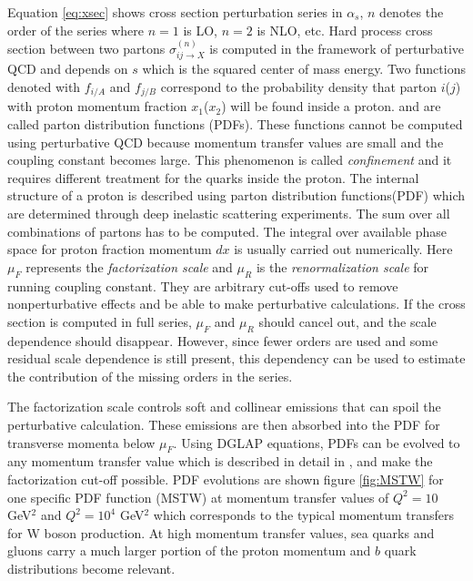 \par Equation \ref{eq:xsec} shows cross section perturbation series in $\alpha_s$, $n$ denotes the order of the series where $n=1$ is LO, $n=2$ is NLO, etc. 
Hard process cross section between two partons $\sigma_{ij \rightarrow X}^{(n)}$ is computed in the framework of perturbative QCD and depends on $s$ which is the squared center of mass energy. 
Two functions denoted with $f_{i/A}$ and $f_{j/B}$ correspond to the probability density that parton $i$($j$) with proton momentum fraction $x_1$($x_2$) will be found inside a proton. and are called parton distribution functions (PDFs). These functions cannot be computed using perturbative QCD because momentum transfer values are small and the coupling constant becomes large. This phenomenon is called \textit{confinement} and it requires different treatment for the quarks inside the proton. The internal structure of a proton is described using parton distribution functions(PDF) which  are determined through deep inelastic scattering experiments. The sum over all combinations of partons has to be computed. The integral over available phase space for proton fraction momentum $dx$ is usually carried out numerically. 
Here $\mu_F$ represents the \textit{factorization scale} and $\mu_R$ is the \textit{renormalization scale} for running coupling constant. They are arbitrary cut-offs used to remove nonperturbative effects and be able to make perturbative calculations. If the cross section is computed in full series, $\mu_F$ and $\mu_R$ should cancel out, and the scale dependence should disappear. However, since fewer orders are used and some residual scale dependence is still present, this dependency can be used to estimate the contribution of the missing orders in the series.  
\par  The factorization scale controls soft and collinear emissions that can spoil the perturbative calculation. These emissions are then absorbed into the PDF for transverse momenta below $\mu_F$. Using DGLAP equations, PDFs can be evolved to any momentum transfer value which is described in detail in \cite{Campbell:2006wx}, and make the factorization cut-off possible. PDF evolutions are shown figure \ref{fig:MSTW} for one specific PDF function (MSTW) at momentum transfer values of $Q^2=10$ GeV$^2$ and $Q^2=10^4$ GeV$^2$ which corresponds to the typical momentum transfers for W boson production. At high momentum transfer values, sea quarks and gluons carry a much larger portion of the proton momentum and $b$ quark distributions become relevant.
